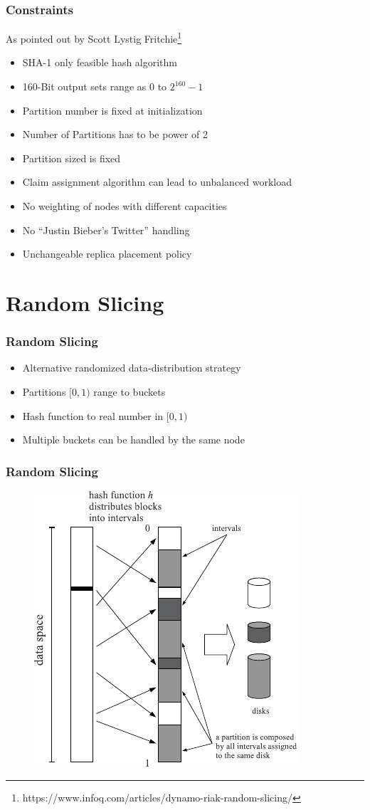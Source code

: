 \documentclass[aspectratio=169]{beamer}
\begin{document}
\begin{frame}
\frametitle{Constraints}
As pointed out by Scott Lystig Fritchie\footnote{https://www.infoq.com/articles/dynamo-riak-random-slicing/}
\begin{itemize}
\item SHA-1 only feasible hash algorithm
\item 160-Bit output sets range as $0$ to $2^{160}-1$
\item Partition number is fixed at initialization
\item Number of Partitions has to be power of 2
\item Partition sized is fixed
\item Claim assignment algorithm can lead to unbalanced workload
\item No weighting of nodes with different capacities
\item No ``Justin Bieber's Twitter'' handling
\item Unchangeable replica placement policy
\end{itemize}
\end{frame}

\section{Random Slicing}
\begin{frame}
\frametitle{Random Slicing}
\begin{itemize}
\item Alternative randomized data-distribution strategy
\item Partitions $[0,1)$ range to buckets
\item Hash function to real number in $[0,1)$
\item Multiple buckets can be handled by the same node
\end{itemize}
\end{frame}

\begin{frame}
\frametitle{Random Slicing}
\begin{figure}
\includegraphics[height=0.8\textheight]{rslicing_description}
\caption{\protect\cite{Miranda2014}}
\end{figure}
\end{frame}
\end{document}
